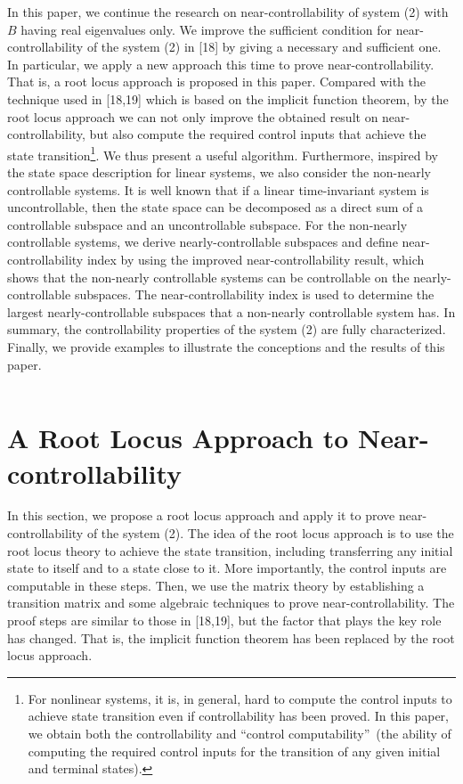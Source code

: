 \documentclass[journal,a4paper,12pt,onecolumn]{IEEEtran}
\begin{document}
$\left. {}\right. $

In this paper, we continue the research on near-controllability of system
(2) with $B$ having real eigenvalues only. We improve the sufficient
condition for near-controllability of the system (2) in [18] by giving a
necessary and sufficient one. In particular, we apply a new approach this
time to prove near-controllability. That is, a root locus approach is
proposed in this paper. Compared with the technique used in [18,19] which is
based on the implicit function theorem, by the root locus approach we can
not only improve the obtained result on near-controllability, but also
compute the required control inputs that achieve the state transition\footnote{For nonlinear systems, it is, in general, hard to compute the control inputs
to achieve state transition even if controllability has been proved. In this
paper, we obtain both the controllability and \textquotedblleft control
computability\textquotedblright\ (the ability of computing the required
control inputs for the transition of any given initial and terminal states).}. We thus present a useful algorithm. Furthermore, inspired by the state
space description for linear systems, we also consider the non-nearly
controllable systems. It is well known that if a linear time-invariant
system is uncontrollable, then the state space can be decomposed as a direct
sum of a controllable subspace and an uncontrollable subspace. For the
non-nearly controllable systems, we derive nearly-controllable subspaces and
define near-controllability index by using the improved near-controllability
result, which shows that the non-nearly controllable systems can be
controllable on the nearly-controllable subspaces. The near-controllability
index is used to determine the largest nearly-controllable subspaces that a
non-nearly controllable system has. In summary, the controllability
properties of the system (2) are fully characterized. Finally, we provide
examples to illustrate the conceptions and the results of this paper.

$\left. {}\right. $

\section{A Root Locus Approach to Near-controllability}

In this section, we propose a root locus approach and apply it to prove
near-controllability of the system (2). The idea of the root locus approach
is to use the root locus theory to achieve the state transition, including
transferring any initial state to itself and to a state close to it. More
importantly, the control inputs are computable in these steps. Then, we use
the matrix theory by establishing a transition matrix and some algebraic
techniques to prove near-controllability. The proof steps are similar to
those in [18,19], but the factor that plays the key role has changed. That
is, the implicit function theorem has been replaced by the root locus
approach.
\end{document}
